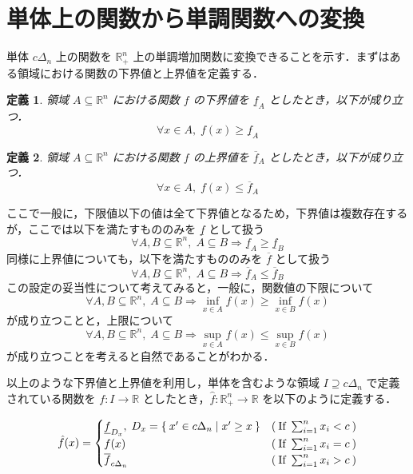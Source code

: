 \documentclass[a4paper,11pt]{jreport}
\newtheorem{definition}{定義}
\begin{document}
\section{単体上の関数から単調関数への変換}

単体 $ c \Delta_n $ 上の関数を $ \mathbb{R}_+^n $ 上の単調増加関数に変換できることを示す．まずはある領域における関数の下界値と上界値を定義する．

\begin{definition}
領域 $ A \subseteq \mathbb{R}^n $ における関数 $ f $ の下界値を $ \underline{f}_A $ としたとき，以下が成り立つ．
$$ \forall x \in A, \; f(x) \geq \underline{f}_A $$
\end{definition}

\begin{definition}
領域 $ A \subseteq \mathbb{R}^n $ における関数 $ f $ の上界値を $ \overline{f}_A $ としたとき，以下が成り立つ．
$$ \forall x \in A, \; f(x) \leq \overline{f}_A $$
\end{definition}

ここで一般に，下限値以下の値は全て下界値となるため，下界値は複数存在するが，ここでは以下を満たすもののみを $ \underline{f} $ として扱う
$$ \forall A, B \subseteq \mathbb{R}^n, \; A \subseteq B \Rightarrow \underline{f}_A \geq \underline{f}_B $$
同様に上界値についても，以下を満たすもののみを $ \overline{f} $ として扱う
$$ \forall A, B \subseteq \mathbb{R}^n, \; A \subseteq B \Rightarrow \overline{f}_A \leq \overline{f}_B $$
この設定の妥当性について考えてみると，一般に，関数値の下限について
$$ \forall A, B \subseteq \mathbb{R}^n, \; A \subseteq B \Rightarrow \inf_{x \in A}f(x) \geq \inf_{x \in B}f(x) $$
が成り立つことと，上限について
$$ \forall A, B \subseteq \mathbb{R}^n, \; A \subseteq B \Rightarrow \sup_{x \in A}f(x) \leq \sup_{x \in B}f(x) $$
が成り立つことを考えると自然であることがわかる．\par
以上のような下界値と上界値を利用し，単体を含むような領域 $ I \supseteq c \Delta_n $ で定義されている関数を $ f : I \to \mathbb{R} $ としたとき，$ \hat{f} : \mathbb{R}_+^n \to \mathbb{R} $ を以下のように定義する．

\begin{align*}
\hat{f}(x) =
\begin{cases}
\underline{f}_{D_x}, \; D_x = \Set{x' \in c \Delta_n | x' \geq x } & ( \: \mbox{If } \sum_{i=1}^{n}x_i < c \: ) \\
f(x)  & ( \: \mbox{If } \sum_{i=1}^{n}x_i = c \: ) \\
\overline{f}_{c \Delta_n} & ( \: \mbox{If } \sum_{i=1}^{n}x_i > c \: ) 
\end{cases}
\end{align*}
\end{document}
